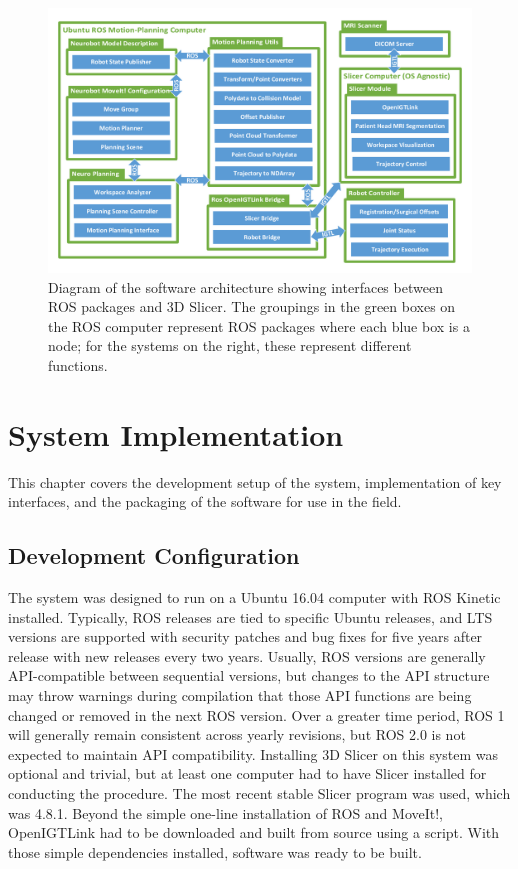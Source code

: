\documentclass[12pt]{report}
\begin{document}
\begin{figure}[thpb]
	\centering
	\includegraphics[width=\textwidth]{diagrams/Software_Diagrams_Simplified.pdf}
    \caption{Diagram of the software architecture showing interfaces between ROS packages and 3D Slicer. The groupings in the green boxes on the ROS computer represent ROS packages where each blue box is a node; for the systems on the right, these represent different functions. }
    \label{fig:softwareDiagram}
\end{figure}


\chapter{System Implementation}
This chapter covers the development setup of the system, implementation of key interfaces, and the packaging of the software for use in the field.


\section{Development Configuration}
\label{developmentConfiguration}
The system was designed to run on a Ubuntu 16.04 computer with ROS Kinetic installed. Typically, ROS releases are tied to specific Ubuntu releases, and LTS versions are supported with security patches and bug fixes for five years after release with new releases every two years. Usually, ROS versions are generally API-compatible between sequential versions, but changes to the API structure may throw warnings during compilation that those API functions are being changed or removed in the next ROS version. Over a greater time period, ROS 1 will generally remain consistent across yearly revisions, but ROS 2.0 is not expected to maintain API compatibility. Installing 3D Slicer on this system was optional and trivial, but at least one computer had to have Slicer installed for conducting the procedure. The most recent stable Slicer program  was used, which was 4.8.1. Beyond the simple one-line installation of ROS and MoveIt!, OpenIGTLink had to be downloaded and built from source using a script. With those simple dependencies installed, software was ready to be built.
\end{document}
